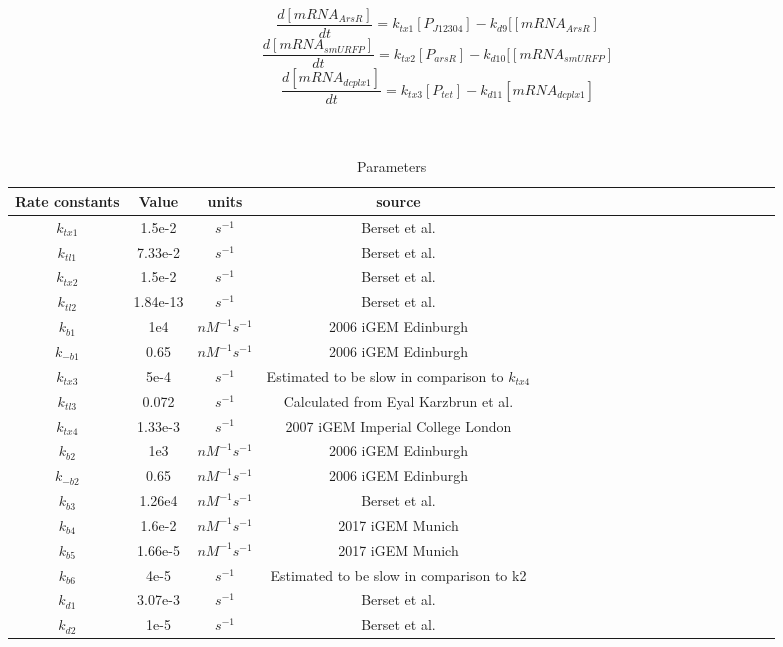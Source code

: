 \begin{equation}
	\frac{d[mRNA_{ArsR}]}{dt}=k_{tx1}[P_{J12304}]-k_{d9}[[mRNA_{ArsR}] \tag{13}
\end{equation}
\begin{equation}
	\frac{d[mRNA_{smURFP}]}{dt}=k_{tx2}[P_{arsR}]-k_{d10}[[mRNA_{smURFP}] \tag{14}
\end{equation}
\begin{equation}
	\frac{d[mRNA_{dcplx1}]}{dt}=k_{tx3}[P_{tet}]-k_{d11}[mRNA_{dcplx1}] \tag{15}
\end{equation}
\\\\
\begin{table}[htbp]
	\centering
	\caption{\label {tab:test} Parameters}
	\begin{tabular}{ccccccccccccccccccccc}
		\toprule
		Rate constants & Value& units & source \\
		\midrule
		$k_{tx1}$ & 1.5e-2&$s^{-1} $& Berset et al. \\
		$k_{tl1}$ & 7.33e-2 &$s^{-1} $& Berset et al.\\
		$k_{tx2}$ & 1.5e-2 & $s^{-1}$ & Berset et al.\\
		$k_{tl2} $&1.84e-13&$s^{-1}$& Berset et al.\\
		$k_{b1} $& 1e4   & $nM^{-1}s^{-1}$ &2006 iGEM Edinburgh  \\
		$k_{-b1}$ & 0.65    & $nM^{-1}s^{-1}$ &2006 iGEM Edinburgh   \\
		$k_{tx3}$& 5e-4 &$s^{-1}$&Estimated to be slow in comparison to $k_{tx4} $\\
		$k_{tl3} $& 0.072   & $s^{-1}$ & Calculated from Eyal Karzbrun et al.  \\
		$k_{tx4} $& 1.33e-3 &$s^{-1}$&2007 iGEM Imperial College London \\
		$k_{b2} $& 1e3   & $nM^{-1}s^{-1}$ &2006 iGEM Edinburgh  \\
		$k_{-b2} $& 0.65    & $nM^{-1}s^{-1}$ &2006 iGEM Edinburgh   \\
		$k_{b3}  $&1.26e4 &$nM^{-1}s^{-1}$ & Berset et al. \\
		$k_{b4}$&1.6e-2& $nM^{-1}s^{-1}$& 2017 iGEM Munich\\
		$k_{b5} $&1.66e-5&$nM^{-1}s^{-1}$&  2017 iGEM Munich\\ 
		$k_{b6}$&4e-5&$s^{-1} $& Estimated to be slow in comparison to k2 \\
		$k_{d1} $& 3.07e-3&$s^{-1} $ & Berset et al.\\
		$k_{d2}$&1e-5&$s^{-1} $ & Berset et al.\\

\end{tabular}
\end{table}
